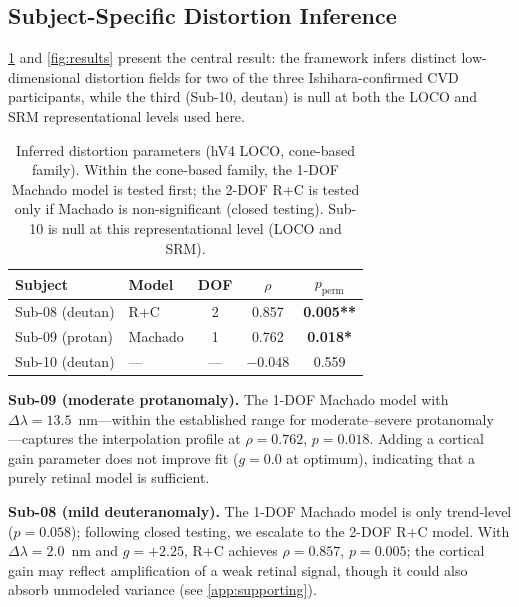\documentclass{article}
\begin{document}
\subsection{Subject-Specific Distortion Inference}

\cref{tab:main} and \cref{fig:results} present the central result: the framework infers distinct low-dimensional distortion fields for two of the three Ishihara-confirmed CVD participants, while the third (Sub-10, deutan) is null at both the LOCO and SRM representational levels used here.

\begin{table}[t]
  \caption{Inferred distortion parameters (hV4 LOCO, cone-based family). Within the cone-based family, the 1-DOF Machado model is tested first; the 2-DOF R+C is tested only if Machado is non-significant (closed testing). Sub-10 is null at this representational level (LOCO and SRM).}
  \label{tab:main}
  \begin{center}
    \begin{small}
      \begin{tabular}{llccc}
        \toprule
        Subject & Model & DOF & $\rho$ & $p_{\text{perm}}$ \\
        \midrule
        Sub-08 (deutan) & R+C & 2 & 0.857 & \textbf{0.005**} \\
        Sub-09 (protan) & Machado & 1 & 0.762 & \textbf{0.018*} \\
        Sub-10 (deutan) & --- & --- & $-0.048$ & 0.559 \\
        \bottomrule
      \end{tabular}
    \end{small}
  \end{center}
  \vskip -0.15in
\end{table}

\textbf{Sub-09 (moderate protanomaly).}
The 1-DOF Machado model with $\Delta\lambda = 13.5$~nm---within the established range for moderate--severe protanomaly \citep{machado2009}---captures the interpolation profile at $\rho = 0.762$, $p = 0.018$.
Adding a cortical gain parameter does not improve fit ($g = 0.0$ at optimum), indicating that a purely retinal model is sufficient.

\textbf{Sub-08 (mild deuteranomaly).}
The 1-DOF Machado model is only trend-level ($p = 0.058$); following closed testing, we escalate to the 2-DOF R+C model.
With $\Delta\lambda = 2.0$~nm and $g = +2.25$, R+C achieves $\rho = 0.857$, $p = 0.005$; the cortical gain may reflect amplification of a weak retinal signal, though it could also absorb unmodeled variance (see \cref{app:supporting}).
\end{document}
